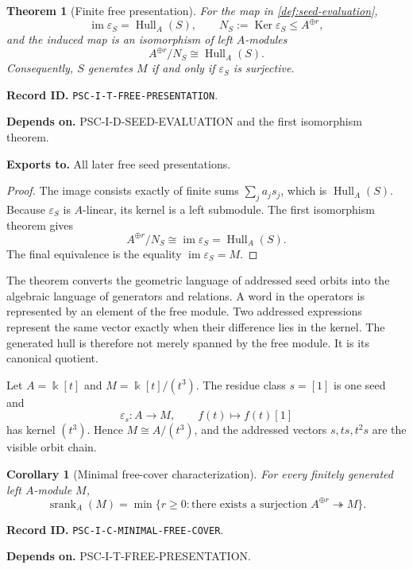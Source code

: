 \documentclass[11pt]{article}
\newtheorem{theorem}{Theorem}[section]
\newtheorem{corollary}[corollary]{Corollary}
\theoremstyle{definition}
\theoremstyle{remark}
\newcommand{\bbk}{\Bbbk}
\newcommand{\Hull}{\operatorname{Hull}}
\newcommand{\srank}{\operatorname{srank}}
\newcommand{\im}{\operatorname{im}}
\newcommand{\Ker}{\operatorname{Ker}}
\newcommand{\RecordID}[1]{\par\smallskip\noindent\begingroup\footnotesize\color{PSCGray}\raggedright\textbf{Record ID.} \nolinkurl{#1}.\par\endgroup}
\newcommand{\Depends}[1]{\par\noindent\begingroup\footnotesize\color{PSCGray}\raggedright\textbf{Depends on.} #1\par\endgroup}
\newcommand{\Exports}[1]{\par\noindent\begingroup\footnotesize\color{PSCGray}\raggedright\textbf{Exports to.} #1\par\endgroup}
\begin{document}
\begin{theorem}[Finite free presentation]
\label{thm:free-presentation}
For the map in \cref{def:seed-evaluation},
\[
\im\varepsilon_S=\Hull_A(S),
\qquad
N_S:=\Ker\varepsilon_S\leq A^{\oplus r},
\]
and the induced map is an isomorphism of left $A$-modules
\[
\boxed{A^{\oplus r}/N_S\cong\Hull_A(S).}
\]
Consequently, $S$ generates $M$ if and only if $\varepsilon_S$ is surjective.
\end{theorem}
\RecordID{PSC-I-T-FREE-PRESENTATION}
\Depends{PSC-I-D-SEED-EVALUATION and the first isomorphism theorem.}
\Exports{All later free seed presentations.}

\begin{proof}
The image consists exactly of finite sums $\sum_ja_js_j$, which is $\Hull_A(S)$.  Because $\varepsilon_S$ is $A$-linear, its kernel is a left submodule.  The first isomorphism theorem gives
\[
A^{\oplus r}/N_S\cong\im\varepsilon_S=\Hull_A(S).
\]
The final equivalence is the equality $\im\varepsilon_S=M$.
\end{proof}

\begin{interpretation}
The theorem converts the geometric language of addressed seed orbits into the algebraic language of generators and relations.  A word in the operators is represented by an element of the free module.  Two addressed expressions represent the same vector exactly when their difference lies in the kernel.  The generated hull is therefore not merely spanned by the free module.  It is its canonical quotient.
\end{interpretation}

\begin{microexample}[title={A cyclic nilpotent chain}]
Let \(A=\bbk[t]\) and \(M=\bbk[t]/(t^3)\).  The residue class \(s=[1]\) is one seed and
\[
\varepsilon_s:A\to M,
\qquad
f(t)\mapsto f(t)[1]
\]
has kernel \((t^3)\).  Hence \(M\cong A/(t^3)\), and the addressed vectors \(s,ts,t^2s\) are the visible orbit chain.
\end{microexample}


\begin{corollary}[Minimal free-cover characterization]
\label{cor:minimal-free-cover}
For every finitely generated left $A$-module $M$,
\[
\boxed{
\srank_A(M)=\min\{r\geq0:\text{there exists a surjection }A^{\oplus r}\twoheadrightarrow M\}.
}
\]
\end{corollary}
\RecordID{PSC-I-C-MINIMAL-FREE-COVER}
\Depends{PSC-I-T-FREE-PRESENTATION.}
\end{document}
